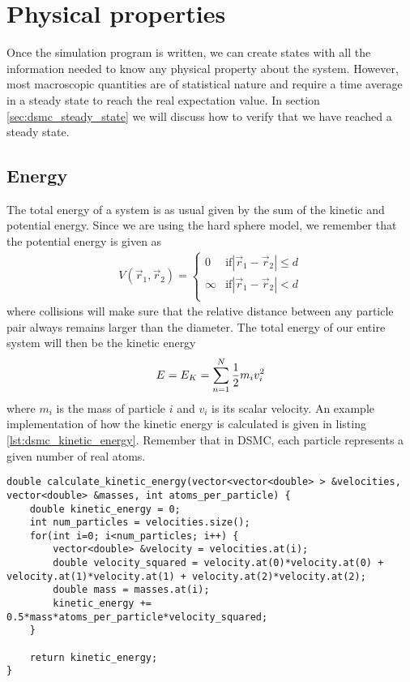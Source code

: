 \section{Physical properties}
Once the simulation program is written, we can create states with all the information needed to know any physical property about the system. However, most macroscopic quantities are of statistical nature and require a time average in a steady state to reach the real expectation value. In section \ref{sec:dsmc_steady_state} we will discuss how to verify that we have reached a steady state. 
\subsection{Energy}
The total energy of a system is as usual given by the sum of the kinetic and potential energy. Since we are using the hard sphere model, we remember that the potential energy is given as
\begin{align}
	V(\vec r_1, \vec r_2) = \left\{
	\begin{array}{lr}
	0 & \text{if} |\vec r_1  - \vec r_2| \leq d\\
	\infty & \text{if} |\vec r_1  - \vec r_2| < d\\
	\end{array}
	\right .
\end{align}
where collisions will make sure that the relative distance between any particle pair always remains larger than the diameter. The total energy of our entire system will then be the kinetic energy
\begin{align}
	E = E_K = \sum_{n=1}^N {1\over 2}m_iv_i^2
\end{align}
where $m_i$ is the mass of particle $i$ and $v_i$ is its scalar velocity. An example implementation of how the kinetic energy is calculated is given in listing \ref{lst:dsmc_kinetic_energy}. Remember that in DSMC, each particle represents a given number of real atoms.

\begin{lstlisting}[caption=Calculation of kinetic energy., label=lst:dsmc_kinetic_energy]
double calculate_kinetic_energy(vector<vector<double> > &velocities, vector<double> &masses, int atoms_per_particle) {
	double kinetic_energy = 0;
	int num_particles = velocities.size();
	for(int i=0; i<num_particles; i++) {
		vector<double> &velocity = velocities.at(i);
		double velocity_squared = velocity.at(0)*velocity.at(0) + velocity.at(1)*velocity.at(1) + velocity.at(2)*velocity.at(2);
		double mass = masses.at(i);
		kinetic_energy += 0.5*mass*atoms_per_particle*velocity_squared;
	}

	return kinetic_energy;
}
\end{lstlisting}

